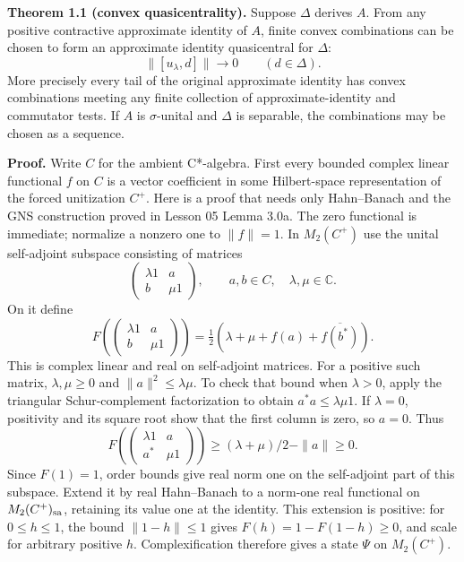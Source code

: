 \documentclass[
  11pt,
]{article}
\begin{document}
\textbf{Theorem 1.1 (convex quasicentrality).} Suppose \(\Delta\)
derives \(A\). From any positive contractive approximate identity of
\(A\), finite convex combinations can be chosen to form an approximate
identity quasicentral for \(\Delta\): \[
\|[u_\lambda,d]\|\longrightarrow0\qquad(d\in\Delta).
\tag{1.2}
\] More precisely every tail of the original approximate identity has
convex combinations meeting any finite collection of
approximate-identity and commutator tests. If \(A\) is \(\sigma\)-unital
and \(\Delta\) is separable, the combinations may be chosen as a
sequence.

\textbf{Proof.} Write \(C\) for the ambient C*-algebra. First every
bounded complex linear functional \(f\) on \(C\) is a vector coefficient
in some Hilbert-space representation of the forced unitization \(C^+\).
Here is a proof that needs only Hahn--Banach and the GNS construction
proved in Lesson 05 Lemma 3.0a. The zero functional is immediate;
normalize a nonzero one to \(\|f\|=1\). In \(M_2(C^+)\) use the unital
self-adjoint subspace consisting of matrices \[
\begin{pmatrix}\lambda1&a\\b&\mu1\end{pmatrix},
\qquad a,b\in C,\quad\lambda,\mu\in\mathbb C.
\] On it define \[
F\left(\begin{pmatrix}\lambda1&a\\b&\mu1\end{pmatrix}\right)
=\tfrac12(\lambda+\mu+f(a)+\overline{f(b^*)}).
\] This is complex linear and real on self-adjoint matrices. For a
positive such matrix, \(\lambda,\mu\geq0\) and
\(\|a\|^2\leq\lambda\mu\). To check that bound when \(\lambda>0\), apply
the triangular Schur-complement factorization to obtain
\(a^*a\leq\lambda\mu1\). If \(\lambda=0\), positivity and its square
root show that the first column is zero, so \(a=0\). Thus \[
F\left(\begin{pmatrix}\lambda1&a\\a^*&\mu1\end{pmatrix}\right)
\geq(\lambda+\mu)/2-\|a\|\geq0.
\] Since \(F(1)=1\), order bounds give real norm one on the self-adjoint
part of this subspace. Extend it by real Hahn--Banach to a norm-one real
functional on \(M_2(C^+)_{\rm sa}\), retaining its value one at the
identity. This extension is positive: for \(0\leq h\leq1\), the bound
\(\|1-h\|\leq1\) gives \(F(h)=1-F(1-h)\geq0\), and scale for arbitrary
positive \(h\). Complexification therefore gives a state \(\Psi\) on
\(M_2(C^+)\).
\end{document}
